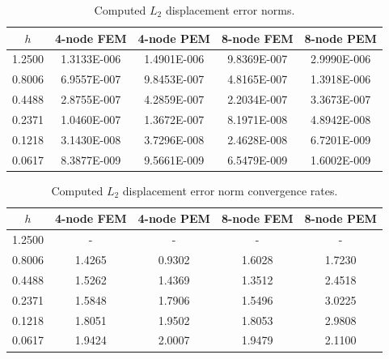 \documentclass[12pt]{article}
\begin{document}
\begin{table}[!ht]
  \begin{center}
    \begin{tabular}{| c | c | c | c | c |}
    \hline
    $h$ & 4-node FEM & 4-node PEM & 8-node FEM & 8-node PEM \\ \hline
    1.2500 & 1.3133E-006 & 1.4901E-006 & 9.8369E-007 & 2.9990E-006 \\ \hline
    0.8006 & 6.9557E-007 & 9.8453E-007 & 4.8165E-007 & 1.3918E-006 \\ \hline
    0.4488 & 2.8755E-007 & 4.2859E-007 & 2.2034E-007 & 3.3673E-007 \\ \hline
    0.2371 & 1.0460E-007 & 1.3672E-007 & 8.1971E-008 & 4.8942E-008 \\ \hline
    0.1218 & 3.1430E-008 & 3.7296E-008 & 2.4628E-008 & 6.7201E-009 \\ \hline
    0.0617 & 8.3877E-009 & 9.5661E-009 & 6.5479E-009 & 1.6002E-009 \\
    \hline
    \end{tabular}
    \caption{Computed $L_2$ displacement error norms.}
    \vspace{-5pt}
    \label{tab:l2_error}
    \vspace{-25pt}
  \end{center}
\end{table}
\begin{table}[!ht]
  \begin{center}
    \begin{tabular}{| c | c | c | c | c |}
    \hline
    $h$ & 4-node FEM & 4-node PEM & 8-node FEM & 8-node PEM \\ \hline
    1.2500 &	-	&	-	&	-	&       -      \\ \hline
    0.8006 &	1.4265	&	0.9302	&	1.6028	&	1.7230 \\ \hline
    0.4488 &	1.5262	&	1.4369	&	1.3512	&	2.4518 \\ \hline
    0.2371 &	1.5848	&	1.7906	&	1.5496	&	3.0225 \\ \hline
    0.1218 &	1.8051	&	1.9502	&	1.8053	&	2.9808 \\ \hline
    0.0617 &	1.9424	&	2.0007	&	1.9479	&	2.1100 \\
    \hline
    \end{tabular}
    \caption{Computed $L_2$ displacement error norm convergence rates.}
    \vspace{-5pt}
    \label{tab:l2_rates}
    \vspace{-25pt}
  \end{center}
\end{table}
\end{document}
